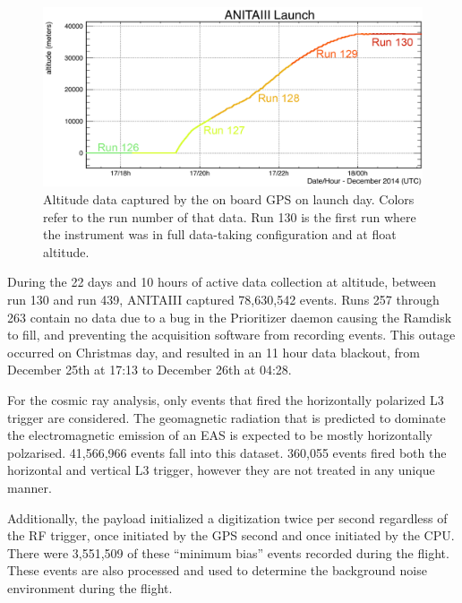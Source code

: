 \begin{figure}
	\centering
	\includegraphics[width=\textwidth]{figures/LaunchAltitude}
	\caption{Altitude data captured by the on board GPS on launch day.  Colors refer to the run number of that data.  Run 130 is the first run where the instrument was in full data-taking configuration and at float altitude.}
	\label{fig:AnitaLaunchAltitude}
\end{figure}	

		During the 22 days and 10 hours of active data collection at altitude, between run 130 and run 439, ANITAIII captured 78,630,542 events.  Runs 257 through 263 contain no data due to a bug in the Prioritizer daemon causing the Ramdisk to fill, and preventing the acquisition software from recording events.  This outage occurred on Christmas day, and resulted in an 11 hour data blackout, from December 25th at 17:13 to December 26th at 04:28.
		
		For the cosmic ray analysis, only events that fired the horizontally polarized L3 trigger are considered. The geomagnetic radiation that is predicted to dominate the electromagnetic emission of an EAS is expected to be mostly horizontally polzarised. 41,566,966 events fall into this dataset.  360,055 events fired both the horizontal and vertical L3 trigger, however they are not treated in any unique manner.
		
		Additionally, the payload initialized a digitization twice per second regardless of the RF trigger, once initiated by the GPS second and once initiated by the CPU.  There were 3,551,509 of these ``minimum bias'' events recorded during the flight.  These events are also processed and used to determine the background noise environment during the flight.
		
	
